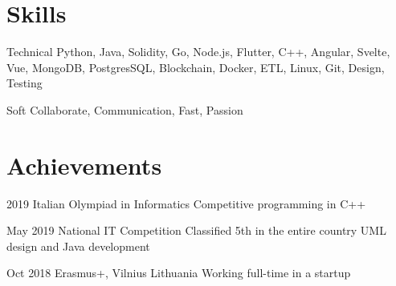 \documentclass{tccv}
\begin{document}
\section{Skills}

\begin{factlist}

\item{Technical}
     {Python, Java, Solidity, Go, Node.js, Flutter, C++, Angular, Svelte, Vue, MongoDB, PostgresSQL, Blockchain, Docker, ETL, Linux, Git, Design, Testing}

\item{Soft}
     {Collaborate, Communication, Fast, Passion}

\end{factlist}


\section{Achievements}

\begin{yearlist}

\item[]{2019}
     {Italian Olympiad in Informatics}
     {Competitive programming in C++}

\item[]{May 2019}
     {National IT Competition}
     {Classified 5th in the entire country \newline
     UML design and Java development}

\item[]{Oct 2018}
     {Erasmus+, Vilnius Lithuania}
     {Working full-time in a startup}

\end{yearlist}
\end{document}
